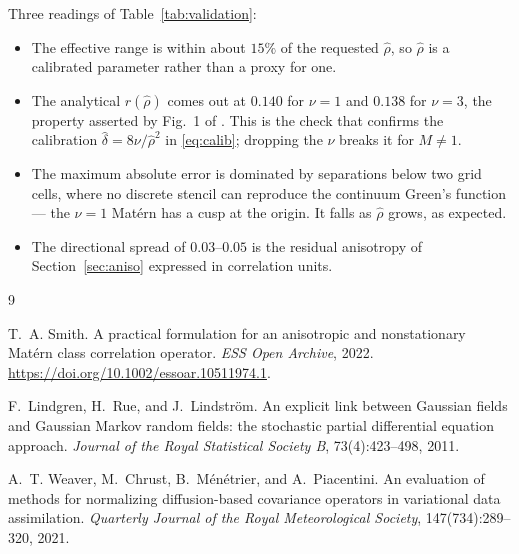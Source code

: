 \documentclass[11pt]{article}
\newcommand{\dhat}{\hat{\delta}}
\newcommand{\rhohat}{\hat{\rho}}
\begin{document}
Three readings of Table~\ref{tab:validation}:

\begin{itemize}
  \item The effective range is within about $15\%$ of the requested $\rhohat$, so
  $\rhohat$ is a calibrated parameter rather than a proxy for one.

  \item The analytical $r(\rhohat)$ comes out at $0.140$ for $\nu=1$ and $0.138$ for
  $\nu=3$, the property asserted by Fig.~1 of \citet{smith2022}. This is the check that
  confirms the calibration $\dhat = 8\nu/\rhohat^2$ in \eqref{eq:calib}; dropping the
  $\nu$ breaks it for $M \neq 1$.

  \item The maximum absolute error is dominated by separations below two grid cells,
  where no discrete stencil can reproduce the continuum Green's function --- the $\nu=1$
  Mat\'ern has a cusp at the origin. It falls as $\rhohat$ grows, as expected.

  \item The directional spread of $0.03$--$0.05$ is the residual anisotropy of
  Section~\ref{sec:aniso} expressed in correlation units.
\end{itemize}

\begin{thebibliography}{9}

T.~A. Smith.
\newblock A practical formulation for an anisotropic and nonstationary Mat\'ern class
correlation operator.
\newblock \emph{ESS Open Archive}, 2022.
\newblock \url{https://doi.org/10.1002/essoar.10511974.1}.

F.~Lindgren, H.~Rue, and J.~Lindstr\"om.
\newblock An explicit link between Gaussian fields and Gaussian Markov random fields: the
stochastic partial differential equation approach.
\newblock \emph{Journal of the Royal Statistical Society B}, 73(4):423--498, 2011.

A.~T. Weaver, M.~Chrust, B.~M\'en\'etrier, and A.~Piacentini.
\newblock An evaluation of methods for normalizing diffusion-based covariance operators in
variational data assimilation.
\newblock \emph{Quarterly Journal of the Royal Meteorological Society}, 147(734):289--320,
2021.

\end{thebibliography}
\end{document}
